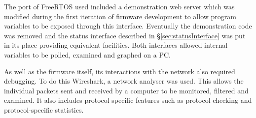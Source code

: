 			The port of FreeRTOS used included a demonstration web server which was
			modified during the first iteration of firmware development to allow
			program variables to be exposed through this interface. Eventually the
			demonstration code was removed and the status interface described in
			\S\ref{sec:statusInterface} was put in its place providing equivalent
			facilities. Both interfaces allowed internal variables to be polled,
			examined and graphed on a PC.
			
			As well as the firmware itself, its interactions with the network also
			required debugging. To do this Wireshark, a network analyser was used.
			This allows the individual packets sent and received by a computer to be
			monitored, filtered and examined. It also includes protocol specific
			features such as protocol checking and protocol-specific
			statistics.
